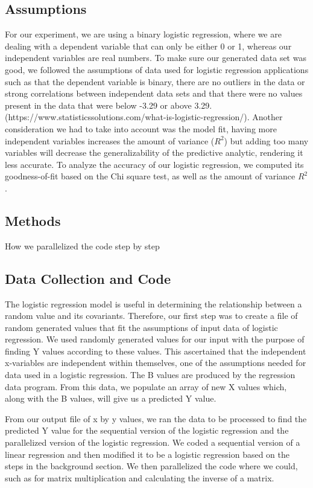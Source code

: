 \documentclass[letterpaper, 10 pt, conference]{ieeeconf}  %
\begin{document}
\subsection{Assumptions}
For our experiment, we are using a binary logistic regression, where we are dealing with a dependent variable that can only be either 0 or 1, whereas our independent variables are real numbers. To make sure our generated data set was good, we followed the assumptions of data used for logistic regression applications such as that the dependent variable is binary, there are no outliers in the data or strong correlations between independent data sets and that there were no values present in the data that were below -3.29 or above 3.29. (https://www.statisticssolutions.com/what-is-logistic-regression/). Another consideration we had to take into account was the model fit, having more independent variables increases the amount of variance ($R^2$) but adding too many variables will decrease the generalizability of the predictive analytic, rendering it less accurate. To analyze the accuracy of our logistic regression, we computed its goodness-of-fit based on the Chi square test, as well as the amount of variance $R^2$. 

\subsection{Methods}
How we parallelized the code step by step

\subsection{Data Collection and Code}
The logistic regression model is useful in determining the relationship between a random value and its covariants. Therefore, our first step was to create a file of random generated values that fit the assumptions of input data of logistic regression. We used randomly generated values for our input with the purpose of finding Y values according to these values. This ascertained that the independent x-variables are independent within themselves, one of the assumptions needed for data used in a logistic regression. The B values are produced by the regression data program. From this data, we populate an array of new X values which, along with the B values, will give us a predicted Y value. 

From our output file of x by y values, we ran the data to be processed to find the predicted Y value for the sequential version of the logistic regression and the parallelized version of the logistic regression. We coded a sequential version of a linear regression and then modified it to be a logistic regression based on the steps in the background section. We then parallelized the code where we could, such as for matrix multiplication and calculating the inverse of a matrix. 
\end{document}
